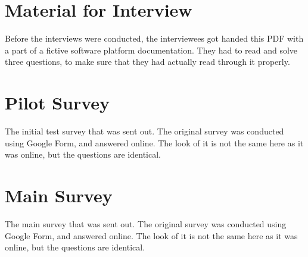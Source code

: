 \documentclass{cslthse-msc}
\begin{document}
    \begin{appendices}
        \chapter{Material for Interview}\label{interviewMaterial}
        Before the interviews were conducted, the interviewees got handed this PDF with a part of a fictive software platform documentation. They had to read and solve three questions, to make sure that they had actually read through it properly.
        
        \chapter{Pilot Survey}\label{pilotsurvey}
        The initial test survey that was sent out. The original survey was conducted using Google Form, and answered online. The look of it is not the same here as it was online, but the questions are identical.
        
        \chapter{Main Survey}\label{mainsurvey}
        The main survey that was sent out. The original survey was conducted using Google Form, and answered online. The look of it is not the same here as it was online, but the questions are identical.
        
    \end{appendices}
\end{document}
